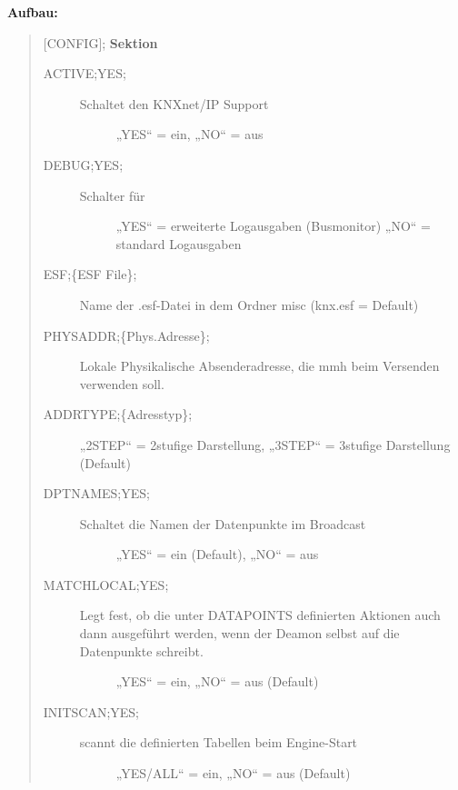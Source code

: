 \documentclass[letterpaper,10pt,english]{sphinxmanual}
\begin{document}
\textbf{Aufbau:}
\begin{quote}

{[}CONFIG{]}; \textbf{Sektion}
\begin{description}
\item[{ACTIVE;YES;}] \leavevmode\begin{description}
\item[{Schaltet den KNXnet/IP Support}] \leavevmode
„YES“ = ein,
„NO“ = aus

\end{description}

\item[{DEBUG;YES;}] \leavevmode\begin{description}
\item[{Schalter für}] \leavevmode
„YES“ = erweiterte Logausgaben (Busmonitor)
„NO“ = standard Logausgaben

\end{description}

\item[{ESF;\{ESF File\};}] \leavevmode
Name der .esf-Datei in dem Ordner misc
(knx.esf = Default)

\item[{PHYSADDR;\{Phys.Adresse\};}] \leavevmode
Lokale Physikalische Absenderadresse, die mmh beim Versenden verwenden soll.

\item[{ADDRTYPE;\{Adresstyp\};}] \leavevmode
„2STEP“ = 2stufige Darstellung, „3STEP“ = 3stufige
Darstellung (Default)

\item[{DPTNAMES;YES;}] \leavevmode\begin{description}
\item[{Schaltet die Namen der Datenpunkte im Broadcast}] \leavevmode
„YES“ = ein (Default),
„NO“ = aus

\end{description}

\item[{MATCHLOCAL;YES;}] \leavevmode\begin{description}
\item[{Legt fest, ob die unter DATAPOINTS definierten Aktionen auch dann ausgeführt werden, wenn der Deamon selbst auf die Datenpunkte schreibt.}] \leavevmode
„YES“ = ein,
„NO“ = aus (Default)

\end{description}

\item[{INITSCAN;YES;}] \leavevmode\begin{description}
\item[{scannt die definierten Tabellen beim Engine-Start}] \leavevmode
„YES/ALL“ = ein,
„NO“ = aus (Default)


\end{description}
\end{description}
\end{quote}
\end{document}
